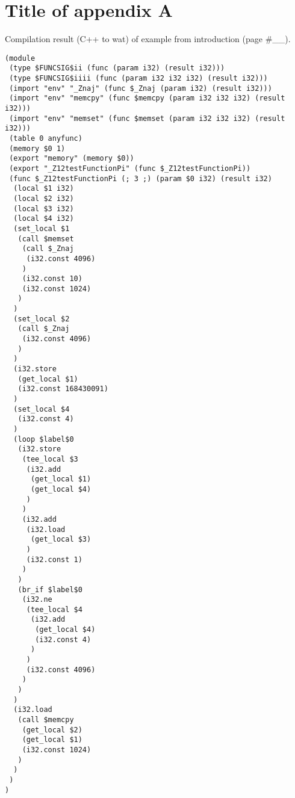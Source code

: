\chapter{Title of appendix A}

Compilation result (C++ to wat) of example from introduction (page #__).

\begin{verbatim}
(module
 (type $FUNCSIG$ii (func (param i32) (result i32)))
 (type $FUNCSIG$iiii (func (param i32 i32 i32) (result i32)))
 (import "env" "_Znaj" (func $_Znaj (param i32) (result i32)))
 (import "env" "memcpy" (func $memcpy (param i32 i32 i32) (result i32)))
 (import "env" "memset" (func $memset (param i32 i32 i32) (result i32)))
 (table 0 anyfunc)
 (memory $0 1)
 (export "memory" (memory $0))
 (export "_Z12testFunctionPi" (func $_Z12testFunctionPi))
 (func $_Z12testFunctionPi (; 3 ;) (param $0 i32) (result i32)
  (local $1 i32)
  (local $2 i32)
  (local $3 i32)
  (local $4 i32)
  (set_local $1
   (call $memset
    (call $_Znaj
     (i32.const 4096)
    )
    (i32.const 10)
    (i32.const 1024)
   )
  )
  (set_local $2
   (call $_Znaj
    (i32.const 4096)
   )
  )
  (i32.store
   (get_local $1)
   (i32.const 168430091)
  )
  (set_local $4
   (i32.const 4)
  )
  (loop $label$0
   (i32.store
    (tee_local $3
     (i32.add
      (get_local $1)
      (get_local $4)
     )
    )
    (i32.add
     (i32.load
      (get_local $3)
     )
     (i32.const 1)
    )
   )
   (br_if $label$0
    (i32.ne
     (tee_local $4
      (i32.add
       (get_local $4)
       (i32.const 4)
      )
     )
     (i32.const 4096)
    )
   )
  )
  (i32.load
   (call $memcpy
    (get_local $2)
    (get_local $1)
    (i32.const 1024)
   )
  )
 )
)
\end{verbatim}